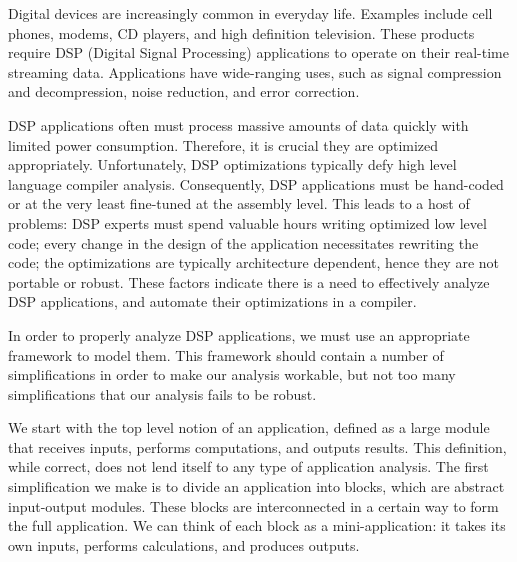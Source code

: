 

    Digital devices are increasingly common in everyday
life. Examples include cell phones, modems, CD players, and high
definition television. These products require DSP (Digital Signal
Processing) applications to operate on their real-time streaming
data. Applications have wide-ranging uses, such as signal
compression and decompression, noise reduction, and error
correction.

    DSP applications often must process massive amounts of data
quickly with limited power consumption. Therefore, it is crucial
they are optimized appropriately. Unfortunately, DSP optimizations
typically defy high level language compiler analysis.
Consequently, DSP applications must be hand-coded or at the very
least fine-tuned at the assembly level. This leads to a host of
problems: DSP experts must spend valuable hours writing optimized
low level code; every change in the design of the application
necessitates rewriting the code; the optimizations are typically
architecture dependent, hence they are not portable or robust.
These factors indicate there is a need to effectively analyze DSP
applications, and automate their optimizations in a compiler.


    In order to properly analyze DSP applications, we must use an
appropriate framework to model them.  This framework should
contain a number of simplifications in order to make our analysis
workable, but not too many simplifications that our analysis fails
to be robust.

    We start with the top level notion of an
application, defined as a large module that receives inputs,
performs computations, and outputs results.  This definition,
while correct, does not lend itself to any type of application
analysis. The first simplification we make is to divide an
application into blocks, which are abstract input-output modules.
These blocks are interconnected in a certain way to form the full
application. We can think of each block as a mini-application: it
takes its own inputs, performs calculations, and produces outputs.

